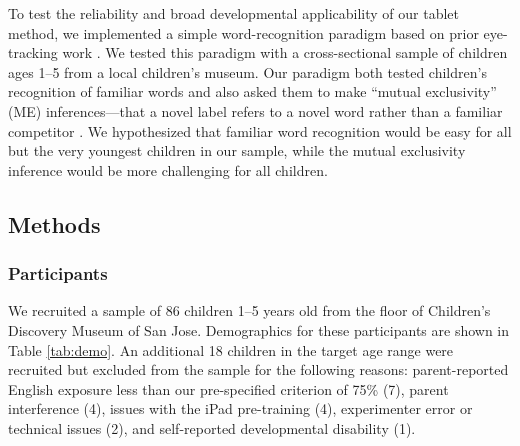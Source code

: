 \documentclass[man,noapacite]{apa2}
\begin{document}
To test the reliability and broad developmental applicability of our tablet method, we implemented a simple word-recognition paradigm based on prior eye-tracking work \cite{fernald1998,fernald2006,bion2013}. We tested this paradigm with a cross-sectional sample of children ages 1--5 from a local children's museum. Our paradigm both tested children's recognition of familiar words and also asked them to make ``mutual exclusivity'' (ME) inferences---that a novel label refers to a novel word rather than a familiar competitor \cite{markman1988}. We hypothesized that familiar word recognition would be easy for all but the very youngest children in our sample, while the mutual exclusivity inference would be more challenging for all children.

\subsection{Methods}

\subsubsection{Participants}                                                                                                                              


We recruited a sample of 86 children 1--5 years old from the floor of Children's Discovery Museum of San Jose. Demographics for these participants are shown in Table \ref{tab:demo}. An additional 18 children in the target age range were recruited but excluded from the sample for the following reasons: parent-reported English exposure less than our pre-specified criterion of 75\% (7), parent interference (4), issues with the iPad pre-training (4), experimenter error or technical issues (2), and self-reported developmental disability (1). 
\end{document}
